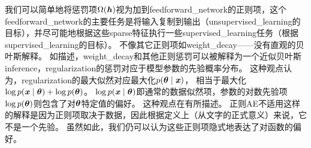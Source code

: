 我们可以简单地将惩罚项$\Omega(\boldsymbol{\mathit{h}})$视为加到\gls{feedforward_network}的正则项，这个\gls{feedforward_network}的主要任务是将输入复制到输出（\gls{unsupervised_learning}的目标），并尽可能地根据这些\gls{sparse}特征执行一些\gls{supervised_learning}任务（根据\gls{supervised_learning}的目标）。
不像其它正则项如\gls{weight_decay}——没有直观的贝叶斯解释。
如描述，\gls{weight_decay}和其他正则惩罚可以被解释为一个近似贝叶斯\gls{inference}，\gls{regularization}的惩罚对应于模型参数的先验概率分布。
这种观点认为，\gls{regularization}的最大似然对应最大化$p(\boldsymbol{\theta} \mid \boldsymbol{\mathit{x}})$， 相当于最大化$\log p(\boldsymbol{\mathit{x}} \mid \boldsymbol{\theta}) + \log p(\boldsymbol{\theta})$。 $\log p(\boldsymbol{\mathit{x}} \mid \boldsymbol{\theta})$即通常的数据似然项，参数的对数先验项$\log p(\boldsymbol{\theta})$则包含了对$\boldsymbol{\theta}$特定值的偏好。
这种观点在有所描述。
正则\gls{AE}不适用这样的解释是因为正则项取决于数据，因此根据定义上（从文字的正式意义）来说，它不是一个先验。
虽然如此，我们仍可以认为这些正则项隐式地表达了对函数的偏好。


